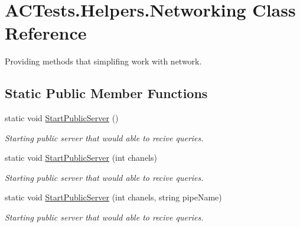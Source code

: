 \hypertarget{class_a_c_tests_1_1_helpers_1_1_networking}{}\section{A\+C\+Tests.\+Helpers.\+Networking Class Reference}
\label{class_a_c_tests_1_1_helpers_1_1_networking}


Providing methods that simplifing work with network.  


\subsection*{Static Public Member Functions}
\begin{DoxyCompactItemize}
\item 
static void \mbox{\hyperlink{class_a_c_tests_1_1_helpers_1_1_networking_ae283b8d84a389c850f793012a5026c98}{Start\+Public\+Server}} ()
\begin{DoxyCompactList}\small\item\em Starting public server that would able to recive queries. \end{DoxyCompactList}\item 
static void \mbox{\hyperlink{class_a_c_tests_1_1_helpers_1_1_networking_a1f28547270cfee57670d6f80842434d3}{Start\+Public\+Server}} (int chanels)
\begin{DoxyCompactList}\small\item\em Starting public server that would able to recive queries. \end{DoxyCompactList}\item 
static void \mbox{\hyperlink{class_a_c_tests_1_1_helpers_1_1_networking_a29d847bed88e1eec30f2022b6af17e64}{Start\+Public\+Server}} (int chanels, string pipe\+Name)
\begin{DoxyCompactList}\small\item\em Starting public server that would able to recive queries. \end{DoxyCompactList}\end{DoxyCompactItemize}
